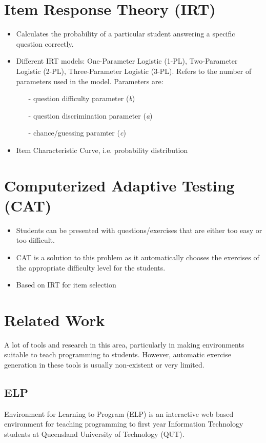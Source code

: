 \documentclass[11pt,a4paper]{report}
\begin{document}
\section{Item Response Theory (IRT)}

\begin{itemize}
\item Calculates the probability of a particular student answering a specific question correctly.
\item Different IRT models: One-Parameter Logistic (1-PL), Two-Parameter Logistic (2-PL), Three-Parameter Logistic (3-PL). Refers to the number of parameters used in the model. Parameters are: 

\begin{itemize}
\item[-] question difficulty parameter (\textit{b})
\item[-] question discrimination parameter (\textit{a})
\item[-] chance/guessing paramter (\textit{c})
\end{itemize}

\item Item Characteristic Curve, i.e. probability distribution

\end{itemize}

\section{Computerized Adaptive Testing (CAT)}
\begin{itemize}
\item Students can be presented with questions/exercises that are either too easy or too difficult.
\item CAT is a solution to this problem as it automatically chooses the exercises of the appropriate difficulty level for the students.
\item Based on IRT for item selection
\end{itemize}

\section{Related Work}
A lot of tools and research in this area, particularly in making environments suitable to teach programming to students. However, automatic exercise generation in these tools is usually non-existent or very limited.
\subsection{ELP}
Environment for Learning to Program (ELP) is an interactive web based environment for teaching programming to first year Information Technology students at Queensland University of Technology (QUT). 
\end{document}
